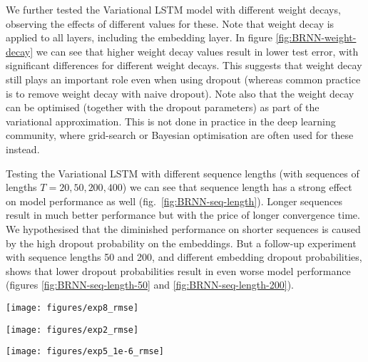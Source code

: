 \documentclass{article}
\theoremstyle{definition}
\begin{document}
We further tested the Variational LSTM model with different weight decays, observing the effects of different values for these. Note that weight decay is applied to all layers, including the embedding layer. In figure \ref{fig:BRNN-weight-decay} we can see that higher weight decay values result in lower test error, with significant differences for different weight decays. This suggests that weight decay still plays an important role even when using dropout (whereas common practice is to remove weight decay with naive dropout). Note also that the weight decay can be optimised (together with the dropout parameters) as part of the variational approximation. This is not done in practice in the deep learning community, where grid-search or Bayesian optimisation are often used for these instead.


Testing the Variational LSTM with different sequence lengths (with sequences of lengths $T=20, 50, 200, 400$) we can see that sequence length has a strong effect on model performance as well (fig.\ \ref{fig:BRNN-seq-length}). Longer sequences result in much better performance but with the price of longer convergence time. We hypothesised that the diminished performance on shorter sequences is caused by the high dropout probability on the embeddings. But a follow-up experiment with sequence lengths  50 and 200, and different embedding dropout probabilities, shows that lower dropout probabilities result in even worse model performance (figures \ref{fig:BRNN-seq-length-50} and \ref{fig:BRNN-seq-length-200}).




\begin{figure*}[b!]
\begin{minipage}{0.3\linewidth}
\vspace{-10mm}
\texttt{[image: figures/exp8\_rmse]}

\vspace{-2mm}
\caption{$p_E=0, ..., 0.5$ with fixed $p_U=0.5$.}
\label{fig:BRNN-seq-length-200}
\end{minipage}
\hspace{2mm}
\begin{minipage}{0.3\linewidth}
\vspace{-10mm}
\texttt{[image: figures/exp2\_rmse]}

\vspace{-2mm}
\caption{Test error for Variational LSTM with different weight decays.}
\label{fig:BRNN-weight-decay}
\end{minipage}
\hspace{2mm}
\begin{minipage}{0.3\linewidth}
\texttt{[image: figures/exp5\_1e-6\_rmse]}

\vspace{-2mm}
\caption{Variational LSTM test error for different sequence lengths ($T=20,50,200,400$ cut-offs).}
\label{fig:BRNN-seq-length}
\end{minipage}
\end{figure*}
\end{document}
